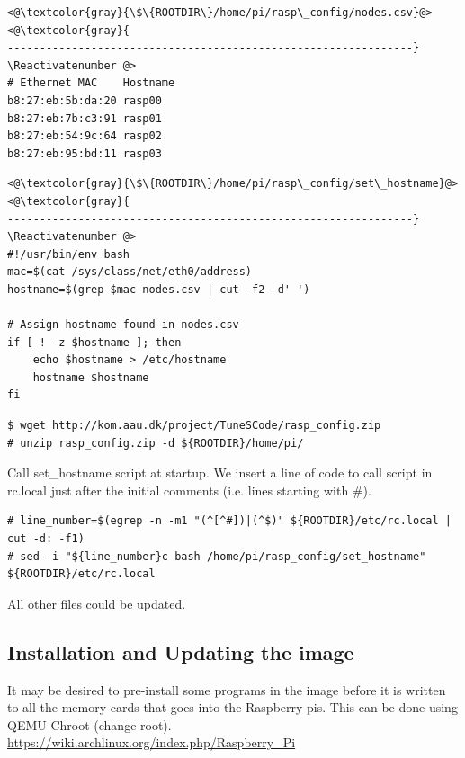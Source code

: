 \Suppressnumber\begin{lstlisting}[]
<@\textcolor{gray}{\$\{ROOTDIR\}/home/pi/rasp\_config/nodes.csv}@>
<@\textcolor{gray}{
---------------------------------------------------------------}
\Reactivatenumber @>
# Ethernet MAC    Hostname
b8:27:eb:5b:da:20 rasp00
b8:27:eb:7b:c3:91 rasp01
b8:27:eb:54:9c:64 rasp02
b8:27:eb:95:bd:11 rasp03
\end{lstlisting}
\FloatBarrier


\Suppressnumber\begin{lstlisting}[]
<@\textcolor{gray}{\$\{ROOTDIR\}/home/pi/rasp\_config/set\_hostname}@>
<@\textcolor{gray}{
---------------------------------------------------------------}
\Reactivatenumber @>
#!/usr/bin/env bash
mac=$(cat /sys/class/net/eth0/address)
hostname=$(grep $mac nodes.csv | cut -f2 -d' ')

# Assign hostname found in nodes.csv
if [ ! -z $hostname ]; then
    echo $hostname > /etc/hostname
    hostname $hostname
fi
\end{lstlisting}
\FloatBarrier



\begin{lstlisting}[]
$ wget http://kom.aau.dk/project/TuneSCode/rasp_config.zip
# unzip rasp_config.zip -d ${ROOTDIR}/home/pi/
\end{lstlisting}
\FloatBarrier


Call set\_hostname script at startup. We insert a line of code to call script in rc.local just after the initial comments (i.e. lines starting with \#).
\begin{lstlisting}[]
# line_number=$(egrep -n -m1 "(^[^#])|(^$)" ${ROOTDIR}/etc/rc.local | cut -d: -f1)
# sed -i "${line_number}c bash /home/pi/rasp_config/set_hostname" ${ROOTDIR}/etc/rc.local
\end{lstlisting}
\FloatBarrier


All other files could be updated.

\subsection{Installation and Updating the image}

It may be desired to pre-install some programs in the image before it is
written to all the memory cards that goes into the Raspberry pis.
This can be done using QEMU Chroot (change root).
\url{https://wiki.archlinux.org/index.php/Raspberry_Pi}

